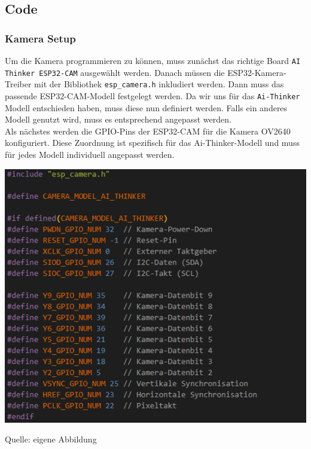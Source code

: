 \documentclass[ngerman,12pt,a4paper]{article}
\begin{document}
		\subsection{Code} %
			\subsubsection{Kamera Setup}
			Um die Kamera programmieren zu können, muss zunächst das richtige Board \texttt{AI Thinker ESP32-CAM} ausgewählt werden. Danach müssen die ESP32-Kamera-Treiber mit der Bibliothek \texttt{esp\_camera.h} inkludiert werden. Dann muss das passende ESP32-CAM-Modell festgelegt werden. Da wir uns für das \texttt{Ai-Thinker} Modell entschieden haben, muss diese nun definiert werden. Falls ein anderes Modell genutzt wird, muss es entsprechend angepasst werden. \\[0.2cm]
			Als nächstes werden die GPIO-Pins der ESP32-CAM für die Kamera OV2640 konfiguriert. Diese Zuordnung ist spezifisch für das Ai-Thinker-Modell und muss für jedes Modell individuell angepasst werden. \\
			\begin{center}
				\begin{minipage}[t]{0.90\textwidth}
					\includegraphics{Pictures/kamera-setup1}
					\label{fig:Kamera-GPIO Konfiguration}
					\vspace{-10pt}
					\begin{center}
						\par\small Quelle: eigene Abbildung 
					\end{center}
				\end{minipage} \\[0.70cm]
			\end{center}
\end{document}
